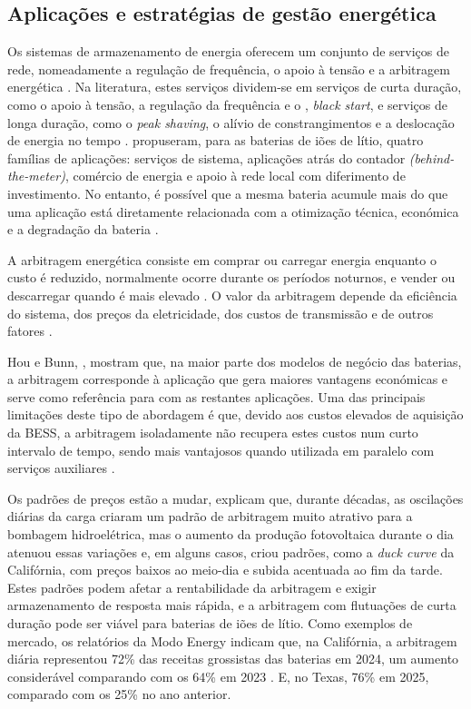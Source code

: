 \subsection{Aplicações e estratégias de gestão energética}
\label{sec:Ch2.2.2}

Os sistemas de armazenamento de energia oferecem um conjunto de serviços de rede, nomeadamente a regulação de frequência, o apoio à tensão e a arbitragem energética \cite{ZhaoZ2023}\cite{ Zhao2023}. Na literatura, estes serviços dividem-se em serviços de curta duração, como o apoio à tensão, a regulação da frequência e o , \textit{black start}, e serviços de longa duração, como o \textit{peak shaving}, o alívio de constrangimentos e a deslocação de energia no tempo \cite{ Prakash2022}. \textcite{ Hesse2017} propuseram, para as baterias de iões de lítio, quatro famílias de aplicações: serviços de sistema, aplicações atrás do contador \textit{(behind-the-meter)}, comércio de energia e apoio à rede local com diferimento de investimento. No entanto, é possível que a mesma bateria acumule mais do que uma aplicação está diretamente relacionada com a otimização técnica, económica e a degradação da bateria \cite{ Zhao2023}.  




A arbitragem energética consiste em comprar ou carregar energia enquanto o custo é reduzido, normalmente ocorre durante os períodos noturnos, e vender ou descarregar quando é mais elevado \cite{ZhaoZ2023}. O valor da arbitragem depende da eficiência do sistema, dos preços da eletricidade, dos custos de transmissão e de outros fatores \cite{ Al-Hallaj2018}. 

Hou e Bunn, \cite{Hou2024}, mostram que, na maior parte dos modelos de negócio das baterias, a arbitragem corresponde à aplicação que gera maiores vantagens económicas e serve como referência para com as restantes aplicações. Uma das principais limitações deste tipo de abordagem é que, devido aos custos elevados de aquisição da BESS, a arbitragem isoladamente não recupera estes custos num curto intervalo de tempo, sendo mais vantajosos quando utilizada em paralelo com serviços auxiliares \cite{ Al-Hallaj2018}. 

Os padrões de preços estão a mudar, \cite{ Hesse2017} explicam que, durante décadas, as oscilações diárias da carga criaram um padrão de arbitragem muito atrativo para a bombagem hidroelétrica, mas o aumento da produção fotovoltaica durante o dia atenuou essas variações e, em alguns casos, criou padrões, como a \textit{duck curve} da Califórnia, com preços baixos ao meio-dia e subida acentuada ao fim da tarde. Estes padrões podem afetar a rentabilidade da arbitragem e exigir armazenamento de resposta mais rápida, e a arbitragem com flutuações de curta duração pode ser viável para baterias de iões de lítio. Como exemplos de mercado, os relatórios da Modo Energy indicam que, na Califórnia, a arbitragem diária representou 72\% das receitas grossistas das baterias em 2024, um aumento considerável comparando com os 64\% em 2023 \cite{Hou2024}. E, no Texas, 76\% em 2025, comparado com os 25\% no ano anterior. 


